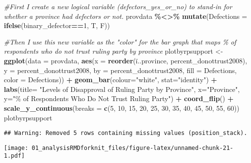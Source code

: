 \documentclass[]{article}
\newenvironment{Shaded}{\begin{snugshade}}{\end{snugshade}}
\newcommand{\CommentTok}[1]{\textcolor[rgb]{0.56,0.35,0.01}{\textit{#1}}}
\newcommand{\DataTypeTok}[1]{\textcolor[rgb]{0.13,0.29,0.53}{#1}}
\newcommand{\DecValTok}[1]{\textcolor[rgb]{0.00,0.00,0.81}{#1}}
\newcommand{\KeywordTok}[1]{\textcolor[rgb]{0.13,0.29,0.53}{\textbf{#1}}}
\newcommand{\NormalTok}[1]{#1}
\newcommand{\OperatorTok}[1]{\textcolor[rgb]{0.81,0.36,0.00}{\textbf{#1}}}
\newcommand{\StringTok}[1]{\textcolor[rgb]{0.31,0.60,0.02}{#1}}
\begin{document}
\begin{Shaded}
\begin{Highlighting}[]
\CommentTok{\#First I create a new logical variable (defectors\_yes\_or\_no) to stand{-}in for whether a province had defectors or not.}
\NormalTok{provdata }\OperatorTok{\%<>\%}
\StringTok{  }\KeywordTok{mutate}\NormalTok{(}\DataTypeTok{Defections =} \KeywordTok{ifelse}\NormalTok{(binary\_defector}\OperatorTok{==}\DecValTok{1}\NormalTok{, T, F))}

\CommentTok{\#Then I use this new variable as the "color" for the bar graph that maps \% of respondents who do not trust ruling party by province}
\NormalTok{plotbyrpsupport <{-}}\StringTok{ }\KeywordTok{ggplot}\NormalTok{(}\DataTypeTok{data =}\NormalTok{ provdata, }\KeywordTok{aes}\NormalTok{(}\DataTypeTok{x =} \KeywordTok{reorder}\NormalTok{(ï..province, percent\_donottrust2008), }\DataTypeTok{y =}\NormalTok{ percent\_donottrust2008, }\DataTypeTok{by =}\NormalTok{ percent\_donottrust2008, }\DataTypeTok{fill =}\NormalTok{ Defections, }\DataTypeTok{color =}\NormalTok{ Defections)) }\OperatorTok{+}\StringTok{ }\KeywordTok{geom\_bar}\NormalTok{(}\DataTypeTok{colour=}\StringTok{"white"}\NormalTok{, }\DataTypeTok{stat=}\StringTok{"identity"}\NormalTok{) }\OperatorTok{+}\StringTok{ }\KeywordTok{labs}\NormalTok{(}\DataTypeTok{title=} \StringTok{"Levels of Disapproval of Ruling Party by Province"}\NormalTok{, }\DataTypeTok{x=}\StringTok{"Province"}\NormalTok{, }\DataTypeTok{y=}\StringTok{"\% of Respondents Who Do Not Trust Ruling Party"}\NormalTok{) }\OperatorTok{+}\StringTok{ }\KeywordTok{coord\_flip}\NormalTok{() }\OperatorTok{+}\StringTok{ }\KeywordTok{scale\_y\_continuous}\NormalTok{(}\DataTypeTok{breaks =} \KeywordTok{c}\NormalTok{(}\DecValTok{5}\NormalTok{, }\DecValTok{10}\NormalTok{, }\DecValTok{15}\NormalTok{, }\DecValTok{20}\NormalTok{, }\DecValTok{25}\NormalTok{, }\DecValTok{30}\NormalTok{, }\DecValTok{35}\NormalTok{, }\DecValTok{40}\NormalTok{, }\DecValTok{45}\NormalTok{, }\DecValTok{50}\NormalTok{, }\DecValTok{55}\NormalTok{, }\DecValTok{60}\NormalTok{))}
\NormalTok{plotbyrpsupport}
\end{Highlighting}
\end{Shaded}

\begin{verbatim}
## Warning: Removed 5 rows containing missing values (position_stack).
\end{verbatim}

\texttt{[image: 01\_analysisRMDforknit\_files/figure-latex/unnamed-chunk-21-1.pdf]}
\end{document}
